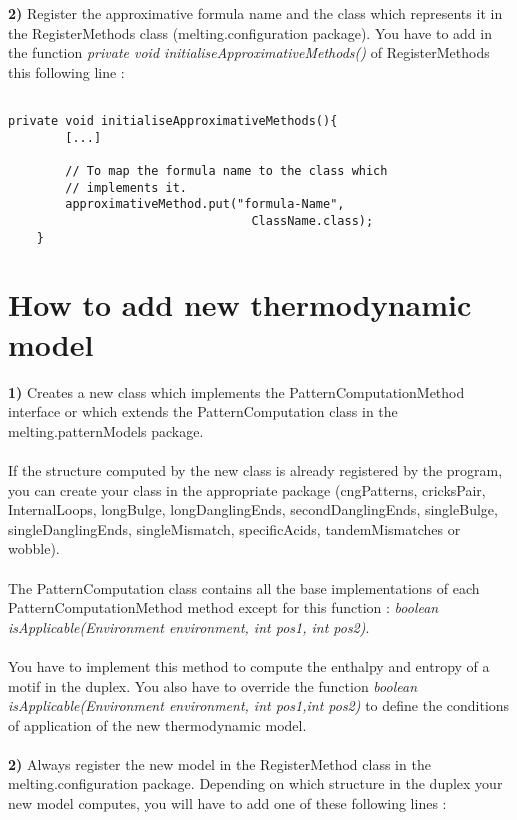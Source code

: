 \documentclass{article}
\begin{document}
\textbf{2)} Register the approximative formula name and the class which represents it in the RegisterMethods
class (melting.configuration package). 
You have to add in the function \textit{private void initialiseApproximativeMethods()} of RegisterMethods
this following line :

\begin{verbatim}

private void initialiseApproximativeMethods(){
		[...]
		
		// To map the formula name to the class which 
		// implements it.
        approximativeMethod.put("formula-Name", 
                                  ClassName.class);
	}

\end{verbatim}

\section{How to add new thermodynamic model}

\textbf{1)} Creates a new class which implements the PatternComputationMethod interface or which extends the 
PatternComputation class in the melting.patternModels package. \\
\\
If the structure computed by the new class is already registered by the program, you can create your class 
in the appropriate package (cngPatterns, cricksPair, InternalLoops, longBulge, longDanglingEnds, 
secondDanglingEnds, singleBulge, singleDanglingEnds, singleMismatch, specificAcids, tandemMismatches or wobble).\\
\\
The PatternComputation class contains all the base implementations of each PatternComputationMethod method
except for this function : \textit{boolean isApplicable(Environment environment, int pos1, int pos2)}.\\
\\
You have to implement this method to compute the enthalpy and entropy of a motif in the duplex.
You also have to override the function \textit{boolean isApplicable(Environment environment, int pos1,int pos2)}
to define the conditions of application of the new thermodynamic model. \\
\\

\textbf{2)} Always register the new model in the RegisterMethod class in the melting.configuration package.
Depending on which structure in the duplex your new model computes, you will have to add one of these
following lines :
\end{document}
